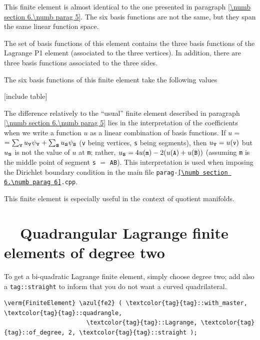 This finite element is almost identical to the one presented in paragraph
\ref{\numb section 6.\numb parag 5}.
The six basis functions are not the same, but they span the same linear function space.

The set of basis functions of this element contains the three basis functions of the
Lagrange P1 element (associated to the three vertices).
In addition, there are three basis functions associated to the three sides.

The six basis functions of this finite element take the following values

[include table]

The difference relatively to the ``usual'' finite element described in paragraph
\ref{\numb section 6.\numb parag 5} lies in the interpretation
of the coefficients when we write a function $u$ as a linear combination of basis functions.
If $ u = $ $ = \sum_{\mbox{\small\tt v}} u_{\mbox{\small\tt v}} \psi_{\mbox{\small\tt v}} +
\sum_{\mbox{\small\tt s}} u_{\mbox{\small\tt s}} \psi_{\mbox{\small\tt s}} $
({\small\tt v} being vertices, {\small\tt s} being segments), then $ u_{\mbox{\small\tt v}} =
u(\mbox{\small\tt v}) $ but $ u_{\mbox{\small\tt s}} $ is not the value of $u$ at {\small\tt m};
rather, $ u_{\mbox{\small\tt s}} = 4 u(\mbox{\small\tt m}) -2 (u(\mbox{\small\tt A}) +
u(\mbox{\small\tt B})) $ (assuming {\small\tt m} is the middle point of segment {\small\tt s}
$=$ {\small\tt AB}).
This interpretation is used when imposing the Dirichlet boundary condition in the main file
{\small\tt parag-\ref{\numb section 6.\numb parag 6}.cpp}.

This finite element is especially useful in the context of quotient manifolds.


\section{~~Quadrangular Lagrange finite elements of degree two}
\label{\numb section 6.\numb parag 7}

To get a bi-quadratic Lagrange finite element, simply choose degree two; add also a 
{\small\tt\textcolor{tag}{tag}::straight} to inform {\maniFEM} that you do not want
a curved quadrilateral.

\begin{Verbatim}[commandchars=\\\{\},formatcom=\small\tt,frame=single,
   label=parag-\ref{\numb section 6.\numb parag 7}.cpp,rulecolor=\color{coment},
   baselinestretch=0.94,framesep=2mm                                            ]
   \verm{FiniteElement} \azul{fe2} ( \textcolor{tag}{tag}::with_master, \textcolor{tag}{tag}::quadrangle,
                       \textcolor{tag}{tag}::Lagrange, \textcolor{tag}{tag}::of_degree, 2, \textcolor{tag}{tag}::straight );
\end{Verbatim}

